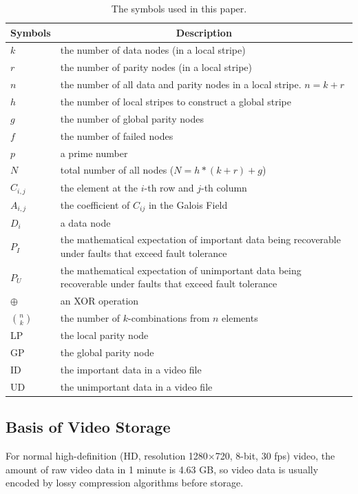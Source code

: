 \documentclass[sigconf]{acmart}
\begin{document}
\begin{table}[]\footnotesize
\caption{The symbols used in this paper.}\label{parameter}
\centering
\begin{tabular}{|p{0.8cm}<{\centering}|p{6.4cm}|}
\hline
Symbols & \multicolumn{1}{c|}{Description} \\ \hline \hline
$k$ & the number of data nodes (in a local stripe) \\ \hline
$r$ & the number of parity nodes (in a local stripe) \\ \hline
$n$ & the number of all data and parity nodes in a local stripe. $n=k+r$ \\ \hline
$h$ & the number of local stripes to construct a global stripe \\ \hline
$g$ & the number of global parity nodes \\ \hline
$f$ & the number of failed nodes \\ \hline
$p$ & a prime number \\ \hline
$N$ & total number of all nodes ($N=h*(k+r)+g$) \\ \hline
$C_{i,j}$ & the element at the $i$-th row and $j$-th column \\ \hline
$A_{i,j}$ &  the coefficient of $C_{ij}$ in the Galois Field \\ \hline
$D_i$ & a data node \\ \hline
$P_{I}$ & the mathematical expectation of important data being recoverable under faults that exceed fault tolerance \\ \hline
$P_{U}$ & the mathematical expectation of unimportant data being recoverable under faults that exceed fault tolerance \\ \hline
$\oplus$ & an XOR operation \\ \hline
$\binom{n}{k}$ & the number of $k$-combinations from $n$ elements\\ \hline
LP & the local parity node \\ \hline
GP & the global parity node \\ \hline
ID & the important data in a video file \\ \hline
UD & the unimportant data in a video file \\ \hline
\end{tabular}

\end{table}


\subsection{Basis of Video Storage}\label{video storage}
For normal high-definition (HD, resolution 1280$\times$720, 8-bit, 30 fps) video, the amount of raw video data in 1 minute is 4.63 GB, so video data is usually encoded by lossy compression algorithms before storage.
\end{document}
